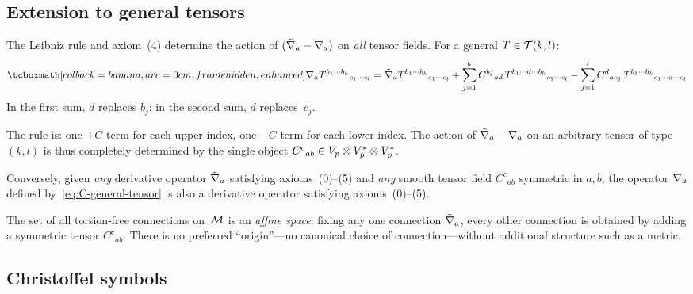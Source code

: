 \subsection{Extension to general tensors}\label{sec:C-general}

The Leibniz rule and axiom~(4) determine the action of
$(\tilde{\nabla}_a - \nabla_a)$ on \emph{all} tensor fields.  For a
general $T\in\mathcal{T}(k,l)$:
\begin{equation}\label{eq:C-general-tensor}
  \eqbox{
  \covd_a T^{b_1\cdots b_k}{}_{c_1\cdots c_l}
  = \tilde\covd_a T^{b_1\cdots b_k}{}_{c_1\cdots c_l}
  + \sum_{j=1}^{k}
    C^{b_j}{}_{ad}\,
    T^{b_1\cdots d\cdots b_k}{}_{c_1\cdots c_l}
  - \sum_{j=1}^{l}
    C^d{}_{ac_j}\,
    T^{b_1\cdots b_k}{}_{c_1\cdots d\cdots c_l}
  }
\end{equation}
In the first sum, $d$ replaces $b_j$; in the second sum, $d$
replaces~$c_j$.

\begin{remark}
  The rule is: one $+C$ term for each upper index, one $-C$
  term for each lower index.  The action of $\tilde{\nabla}_a -
  \nabla_a$ on an arbitrary tensor of type~$(k,l)$ is thus
  completely determined by the single object
  $C^c{}_{ab}\in V_p\otimes V_p^*\otimes V_p^*$.
\end{remark}

\begin{theorem}[Converse]\label{thm:C-converse}
  Conversely, given \emph{any} derivative operator
  $\tilde{\nabla}_a$ satisfying axioms~(0)--(5) and \emph{any}
  smooth tensor field $C^c{}_{ab}$ symmetric in $a,b$,
  the operator $\nabla_a$ defined
  by~\eqref{eq:C-general-tensor} is also a derivative operator
  satisfying axioms~(0)--(5).
\end{theorem}

\begin{intuition}
  The set of all torsion-free connections on~$\mathcal{M}$ is an
  \emph{affine space}: fixing any one connection
  $\tilde{\nabla}_a$, every other connection is obtained by
  adding a symmetric tensor $C^c{}_{ab}$.  There is no
  preferred ``origin''---no canonical choice of
  connection---without additional structure such as a metric.
\end{intuition}

\subsection{Christoffel symbols}\label{sec:christoffel}

